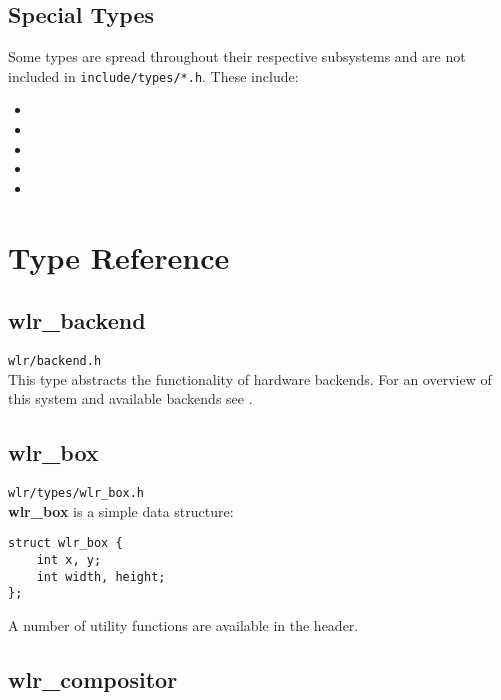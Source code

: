 \documentclass{article}
\newcommand{\code}[1]{\texttt{#1}}
\begin{document}
\subsection{Special Types}\label{special types}

Some types are spread throughout their respective subsystems and are not
included in \code{include/types/*.h}. These include:

\begin{itemize}
    \itemsep0em
    \item {}
    \item {}
    \item {}
    \item {}
    \item {}
\end{itemize}

\newpage
\section{Type Reference}\label{type reference}

\subsection{wlr_backend}\label{wlr backend}

\code{wlr/backend.h}\\

This type abstracts the functionality of hardware backends. For an overview of
this system and available backends see .

\subsection{wlr_box}\label{wlr box}

\code{wlr/types/wlr_box.h}\\

\textbf{wlr_box} is a simple data structure:

\begin{verbatim}
struct wlr_box {
	int x, y;
	int width, height;
};
\end{verbatim}

A number of utility functions are available in the header.

\subsection{wlr_compositor}\label{wlr compositor}
\end{document}
